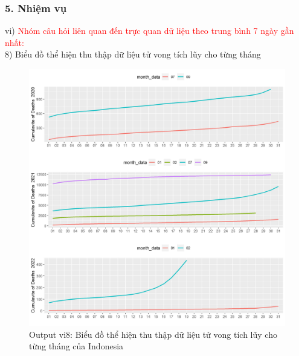 \documentclass[english,10pt,table]{beamer}
\begin{document}
\begin{frame}[fragile]
\frametitle{5.  Nhiệm vụ}
vi) \textcolor{red}{Nhóm câu hỏi liên quan đến trực quan dữ liệu theo trung bình 7 ngày gần nhất:}\\
    8) Biểu đồ thể hiện thu thập dữ liệu tử vong tích lũy cho từng tháng
	\begin{figure}[h!]
	\begin{center}
		    \includegraphics[scale = 0.26]{Images/VI/vi8 Indonesia .jpeg}
		     \caption{Output vi8: Biểu đồ thể hiện thu thập dữ liệu tử vong tích lũy cho từng tháng của Indonesia}
		\end{center}
		\end{figure}
\end{frame}
\end{document}
